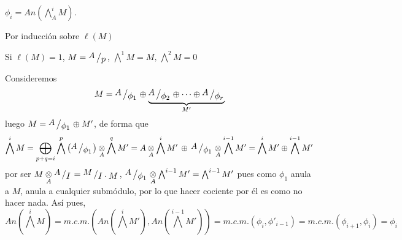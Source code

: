 \begin{prop}
    $\phi_i = An(\bigwedge^i_A M)$. 
\end{prop}
\begin{dem}
    Por inducci\'on sobre $\ell(M)$

    Si $\ell(M)=1$, $M = \modulo{A}{p}$, $\bigwedge^1 M = M, \, \bigwedge^2 M = 0$

    Consideremos $$M = \modulo{A}{\phi_1} \oplus \underbrace{\modulo{A}{\phi_2} \oplus \cdots \oplus \modulo{A}{\phi_r}}_{M'}$$
    luego $M = \modulo{A}{\phi_1} \oplus M'$, de forma que 
    $$\bigwedge^i M = \bigoplus_{p+q=i} \bigwedge^p \left(\modulo{A}{\phi_1} \right) \underset{A}{\otimes} \bigwedge^q M' = A \underset{A}{\otimes}  \bigwedge^i M'\,  \oplus\, \modulo{A}{\phi_1} \underset{A}{\otimes} \bigwedge^{i-1} M'  =\bigwedge^i M ' \oplus \bigwedge^{i-1} M'$$
    por ser $M \underset{A}{\otimes}  \modulo{A}{I} = \modulo{M}{I \cdot M}$, $\modulo{A}{\phi_1} \underset{A}{\otimes} \bigwedge^{i-1} M' =  \bigwedge^{i-1} M'$ pues como $\phi_1$ anula a $M$, anula a cualquier subm\'odulo, por lo que hacer cociente por \'el es como no hacer nada. As\'i pues, 
    $$An\left(\bigwedge^i M \right) = m.c.m.\left(An(\bigwedge^i M') , An(\bigwedge^{i-1} M')\right) = m.c.m.(\phi_i, \phi'_{i-1})  = m.c.m. (\phi_{i+1},\phi_i) = \phi_{i} $$
\end{dem}

